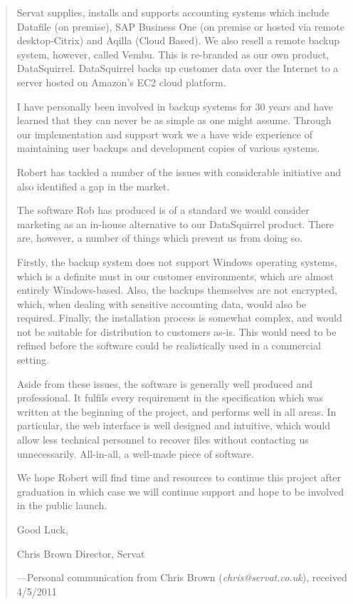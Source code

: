 \begin{quote}
\begin{em}

    Servat supplies, installs and supports accounting systems which include
    Datafile (on premise), SAP Business One (on premise or hosted via remote
    desktop-Citrix) and Aqilla (Cloud Based). We also resell a remote backup
    system, however, called Vembu. This is re-branded as our own product,
    DataSquirrel. DataSquirrel backs up customer data over the Internet to
    a server hosted on Amazon's EC2 cloud platform. 

    I have personally been involved in backup systems for 30 years and have
    learned that they can never be as simple as one might assume. Through our
    implementation and support work we a  have wide experience of maintaining
    user backups and development copies of various systems.

    Robert has tackled a number of the issues with considerable initiative and
    also identified a gap in the market. 

    The software Rob has produced is of a standard we would consider marketing
    as an in-house alternative to our DataSquirrel product. There are, however,
    a number of things which prevent us from doing so.

    Firstly, the backup system does not support Windows operating systems,
    which is a definite must in our customer environments, which are almost
    entirely Windows-based. Also, the backups themselves are not encrypted,
    which, when dealing with sensitive accounting data, would also be required.
    Finally, the installation process is somewhat complex, and would not be
    suitable for distribution to customers as-is. This would need to be refined
    before the software could be realistically used in a commercial setting.

    Aside from these issues, the software is generally well produced and
    professional. It fulfils every requirement in the specification which was
    written at the beginning of the project, and performs well in all areas. In
    particular, the web interface is well designed and intuitive, which would
    allow less technical personnel to recover files without contacting us
    unnecessarily. All-in-all, a well-made piece of software.

    We hope Robert will find time and resources to continue this project after
    graduation in which case we will continue support and hope to be involved
    in the public launch.

    Good Luck,

    Chris Brown
    Director,
    Servat
\end{em}

    ---Personal communication from Chris Brown (\emph{chris@servat.co.uk}),
    received 4/5/2011
\end{quote}

